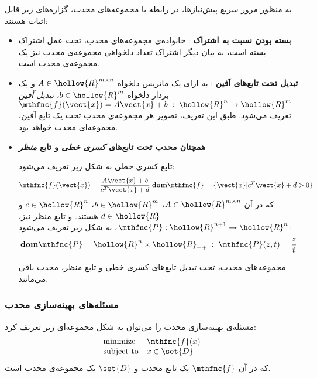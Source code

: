 به منظور مرور سریع پیش‌نیازها، در رابطه با مجموعه‌های محدب، گزاره‌های زیر قابل اثبات هستند:
\begin{itemize}
\item \textbf{
بسته بودن نسبت به اشتراک
}:
خانواده‌ی مجموعه‌های محدب، تحت عمل اشتراک بسته است، به بیان دیگر اشتراک تعداد دلخواهی مجموعه‌ی محدب نیز یک مجموعه‌ی محدب است.

\item \textbf{
تبدیل تحت تابع‌های آفین
}:
به ازای یک ماتریس دلخواه
$A \in \hollow{R}^{m \times n}$
و یک بردار دلخواه
$b \in \hollow{R}^{m}$،
\textit{
تبدیل آفین
}
$\mthfnc{f}( \vect{x} ) = A \vect{x} + b \; : \; \hollow{R}^{n} \rightarrow \hollow{R}^{m}$
تعریف می‌شود. طبق این تعریف، تصویر هر مجموعه‌ی محدب تحت یک تابع آفین، مجموعه‌ای محدب خواهد بود.

\item \textbf{
همچنان محدب تحت تابع‌های
\textit{
کسری خطی
}
و تابع
\textit{
منظر
}
}

تابع کسری خطی به شکل زیر تعریف می‌شود:
\[
\mthfnc{f}( \vect{x} ) = \frac{ A \vect{x} + b }{ c^T \vect{x} + d } \; \mathbf{dom} \mthfnc{f} = \{ \vect{x} | c^T \vect{x} + d > 0 \}
\]
که در آن
$A \in \hollow{R}^{m \times n}$،
$b \in \hollow{R}^m$،
$c \in \hollow{R}^{n}$
و
$d \in \hollow{R}$
هستند. و تابع منظر نیز،
$\mthfnc{P} : \hollow{R}^{n+1} \rightarrow \hollow{R}^n$،
به شکل زیر تعریف می‌شود:
\[
\mathbf{dom} \mthfnc{P} = \hollow{R}^{n} \times \hollow{R}_{++} \; : \; \mthfnc{P}(z,t) = \frac{z}{t}
\]

مجموعه‌های محدب، تحت تبدیل تابع‌های کسری-خطی و تابع منظر، محدب باقی می‌مانند.





\end{itemize}



\subsubsection{
مسئله‌های بهینه‌سازی محدب
}

مسئله‌ی بهینه‌سازی محدب را می‌توان به شکل مجموعه‌ای زیر تعریف کرد:
\[
\begin{array}{ll}
\mbox{minimize} & \mthfnc{f}( x )\\
\mbox{subject to} & x \in \set{D}
\end{array}
\]
که در آن
$\mthfnc{f}$
یک تابع محدب و
$\set{D}$
یک مجموعه‌ی محدب است.

